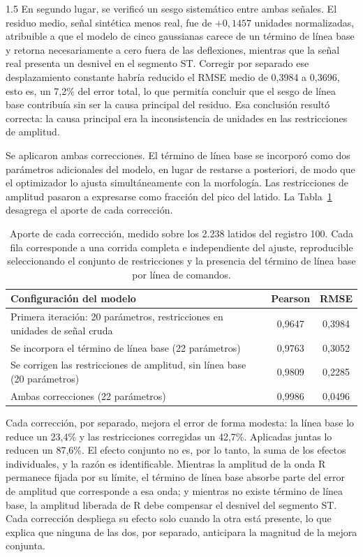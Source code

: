 \begin{spacing}{1.5}
En segundo lugar, se verificó un sesgo sistemático entre ambas señales. El residuo medio, señal sintética menos real, fue de $+0{,}1457$ unidades normalizadas, atribuible a que el modelo de cinco gaussianas carece de un término de línea base y retorna necesariamente a cero fuera de las deflexiones, mientras que la señal real presenta un desnivel en el segmento ST. Corregir por separado ese desplazamiento constante habría reducido el RMSE medio de 0,3984 a 0,3696, esto es, un 7,2\% del error total, lo que permitía concluir que el sesgo de línea base contribuía sin ser la causa principal del residuo. Esa conclusión resultó correcta: la causa principal era la inconsistencia de unidades en las restricciones de amplitud.

Se aplicaron ambas correcciones. El término de línea base se incorporó como dos parámetros adicionales del modelo, en lugar de restarse a posteriori, de modo que el optimizador lo ajusta simultáneamente con la morfología. Las restricciones de amplitud pasaron a expresarse como fracción del pico del latido. La Tabla~\ref{tab:ablacion} desagrega el aporte de cada corrección.

\begin{table}[H]
\centering
\begin{tabular}{|p{7.6cm}|c|c|}
\hline
\textbf{Configuración del modelo} & \textbf{Pearson} & \textbf{RMSE} \\ \hline
Primera iteración: 20 parámetros, restricciones en unidades de señal cruda & 0,9647 & 0,3984 \\ \hline
Se incorpora el término de línea base (22 parámetros) & 0,9763 & 0,3052 \\ \hline
Se corrigen las restricciones de amplitud, sin línea base (20 parámetros) & 0,9809 & 0,2285 \\ \hline
Ambas correcciones (22 parámetros) & 0,9986 & 0,0496 \\ \hline
\end{tabular}
\caption{Aporte de cada corrección, medido sobre los 2.238 latidos del registro 100. Cada fila corresponde a una corrida completa e independiente del ajuste, reproducible seleccionando el conjunto de restricciones y la presencia del término de línea base por línea de comandos.}
\label{tab:ablacion}
\end{table}

Cada corrección, por separado, mejora el error de forma modesta: la línea base lo reduce un 23,4\% y las restricciones corregidas un 42,7\%. Aplicadas juntas lo reducen un 87,6\%. El efecto conjunto no es, por lo tanto, la suma de los efectos individuales, y la razón es identificable. Mientras la amplitud de la onda R permanece fijada por su límite, el término de línea base absorbe parte del error de amplitud que corresponde a esa onda; y mientras no existe término de línea base, la amplitud liberada de R debe compensar el desnivel del segmento ST. Cada corrección despliega su efecto solo cuando la otra está presente, lo que explica que ninguna de las dos, por separado, anticipara la magnitud de la mejora conjunta.


\end{spacing}
